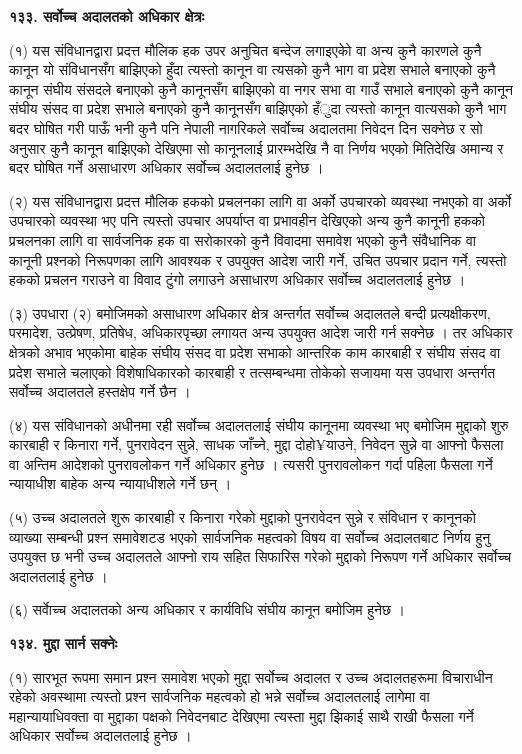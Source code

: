 \textbf{१३३. सर्वोच्च अदालतको अधिकार क्षेत्रः}

(१) यस संविधानद्वारा प्रदत्त मौलिक हक उपर अनुचित बन्देज लगाइएकोे वा अन्य कुनै कारणले कुनै कानून यो संविधानसँग बाझिएको हुँदा त्यस्तो कानून वा त्यसको कुनै भाग वा प्रदेश सभाले बनाएको कुनै कानून संघीय संसदले बनाएको कुनै कानूनसँग बाझिएको वा नगर सभा वा गाउँ सभाले बनाएको कुनै कानून संघीय संसद वा प्रदेश सभाले बनाएको कुनै कानूनसँग बाझिएको हँुदा त्यस्तो कानून वात्यसको कुनै भाग बदर घोषित गरी पाऊँ भनी कुनै पनि नेपाली नागरिकले सर्वोच्च अदालतमा निवेदन दिन सक्नेछ र सो अनुसार कुनै कानून बाझिएको देखिएमा सो कानूनलाई प्रारम्भदेखि नै वा निर्णय भएको मितिदेखि अमान्य र बदर घोषित गर्ने असाधारण अधिकार सर्वोच्च अदालतलाई हुनेछ ।

(२) यस संविधानद्वारा प्रदत्त मौलिक हकको प्रचलनका लागि वा अर्को उपचारको व्यवस्था नभएको वा अर्को उपचारको व्यवस्था भए पनि
त्यस्तो उपचार अपर्याप्त वा प्रभावहीन देखिएको अन्य कुनै कानूनी हकको प्रचलनका लागि वा सार्वजनिक हक वा सरोकारको कुनै विवादमा समावेश भएको कुनै संवैधानिक वा कानूनी प्रश्नको निरूपणका लागि आवश्यक र उपयुक्त आदेश जारी गर्ने, उचित उपचार प्रदान गर्ने, त्यस्तो हकको प्रचलन गराउने वा विवाद टुंगो लगाउने असाधारण अधिकार सर्वोच्च अदालतलाई हुनेछ ।

(३) उपधारा (२) बमोजिमको असाधारण अधिकार क्षेत्र अन्तर्गत सर्वोच्च अदालतले बन्दी प्रत्यक्षीकरण, परमादेश, उत्प्रेषण, प्रतिषेध,
अधिकारपृच्छा लगायत अन्य उपयुक्त आदेश जारी गर्न सक्नेछ । तर अधिकार क्षेत्रको अभाव भएकोमा बाहेक संघीय संसद वा प्रदेश
सभाको आन्तरिक काम कारबाही र संघीय संसद वा प्रदेश सभाले चलाएको विशेषाधिकारको कारबाही र तत्सम्बन्धमा तोकेको सजायमा यस उपधारा अन्तर्गत सर्वोच्च अदालतले हस्तक्षेप गर्ने छैन ।

(४) यस संविधानको अधीनमा रही सर्वोच्च अदालतलाई संघीय कानूनमा व्यवस्था भए बमोजिम मुद्दाको शुरु कारबाही र किनारा गर्ने,
पुनरावेदन सुन्ने, साधक जाँच्ने, मुद्दा दोहो¥याउने, निवेदन सुन्ने वा आफ्नो फैसला वा अन्तिम आदेशको पुनरावलोकन गर्ने अधिकार हुनेछ । त्यसरी पुनरावलोकन गर्दा पहिला फैसला गर्ने न्यायाधीश बाहेक अन्य न्यायाधीशले गर्ने छन् ।

(५) उच्च अदालतले शुरू कारबाही र किनारा गरेको मुद्दाको पुनरावेदन सुन्ने र संविधान र कानूनको व्याख्या सम्बन्धी प्रश्न समावेशटड
भएको सार्वजनिक महत्वको विषय वा सर्वोच्च अदालतबाट निर्णय हुनु उपयुक्त छ भनी उच्च अदालतले आफ्नो राय सहित सिफारिस गरेको मुद्दाको निरूपण गर्ने अधिकार सर्वोच्च अदालतलाई हुनेछ ।

(६) सर्वाेच्च अदालतको अन्य अधिकार र कार्यविधि संघीय कानून बमोजिम हुनेछ ।

\textbf{१३४. मुद्दा सार्न सक्नेः}

(१) सारभूत रूपमा समान प्रश्न समावेश भएको मुद्दा सर्वोच्च अदालत र उच्च अदालतहरूमा विचाराधीन रहेको अवस्थामा त्यस्तो प्रश्न सार्वजनिक महत्वको हो भन्ने सर्वोच्च अदालतलाई लागेमा वा महान्यायाधिवक्ता वा मुद्दाका पक्षको निवेदनबाट देखिएमा त्यस्ता मुद्दा
झिकाई साथै राखी फैसला गर्ने अधिकार सर्वोच्च अदालतलाई हुनेछ ।

